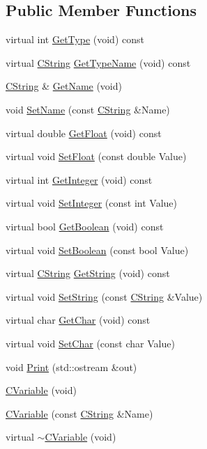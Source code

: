 \subsection*{Public Member Functions}
\begin{DoxyCompactItemize}
\item 
virtual int \hyperlink{classCVariable_acdf7301ad2f5c7fa33770c028211c0bc}{Get\-Type} (void) const 
\item 
virtual \hyperlink{classCString}{C\-String} \hyperlink{classCVariable_ad8a23d1501917cbfb1eee1473a7a2122}{Get\-Type\-Name} (void) const 
\item 
\hyperlink{classCString}{C\-String} \& \hyperlink{classCVariable_ad389c095f0f85ace5694c29d67e4cdda}{Get\-Name} (void)
\item 
void \hyperlink{classCVariable_a27b77051462abdd39ecd45a72b45b560}{Set\-Name} (const \hyperlink{classCString}{C\-String} \&Name)
\item 
virtual double \hyperlink{classCVariable_ac475ad87ffbfaeeb2d4d9c2986b0d575}{Get\-Float} (void) const 
\item 
virtual void \hyperlink{classCVariable_ae352cd2c25541c1137b0f12926d09995}{Set\-Float} (const double Value)
\item 
virtual int \hyperlink{classCVariable_adb0db49f4a55f3e1b5322f6ce26e4ebc}{Get\-Integer} (void) const 
\item 
virtual void \hyperlink{classCVariable_ab97d7164ed35ca67d4bacaebbc7f6fe6}{Set\-Integer} (const int Value)
\item 
virtual bool \hyperlink{classCVariable_a874156d6b1a3a44f799c32a2455c7f49}{Get\-Boolean} (void) const 
\item 
virtual void \hyperlink{classCVariable_a5c8d2cb9ae53c01dc1ec7e45f8903126}{Set\-Boolean} (const bool Value)
\item 
virtual \hyperlink{classCString}{C\-String} \hyperlink{classCVariable_aefa25c880c0042ffc29889475d329004}{Get\-String} (void) const 
\item 
virtual void \hyperlink{classCVariable_a7c536a5709d8df5d9d75013370288c79}{Set\-String} (const \hyperlink{classCString}{C\-String} \&Value)
\item 
virtual char \hyperlink{classCVariable_a6635a8fd2441dcb83a39d10a78187dac}{Get\-Char} (void) const 
\item 
virtual void \hyperlink{classCVariable_a10a96343a4a2437b02b7105adf87a64c}{Set\-Char} (const char Value)
\item 
void \hyperlink{classCVariable_a311bf640114f17a005c276ed0b691777}{Print} (std\-::ostream \&out)
\item 
\hyperlink{classCVariable_ac4db0d1a0f6c5a42a2a746dff0013019}{C\-Variable} (void)
\item 
\hyperlink{classCVariable_a1cc98bbb732c04b93b5efef0299d1304}{C\-Variable} (const \hyperlink{classCString}{C\-String} \&Name)
\item 
virtual \hyperlink{classCVariable_a7fa9d869e8187223db9349dd109b708b}{$\sim$\-C\-Variable} (void)
\end{DoxyCompactItemize}
